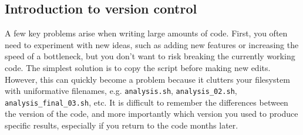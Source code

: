 \subsection{Introduction to version control}

A few key problems arise when writing large amounts of code. First, you often need to experiment with new ideas, such as adding new features or increasing the speed of a bottleneck, but you don't want to risk breaking the currently working code. The simplest solution is to copy the script before making new edits. However, this can quickly become a problem because it clutters your filesystem with uniformative filenames, e.g. \verb|analysis.sh|, \verb|analysis_02.sh|, \verb|analysis_final_03.sh|, etc. It is difficult to remember the differences between the version of the code, and more importantly which version you used to produce specific results, especially if you return to the code months later.